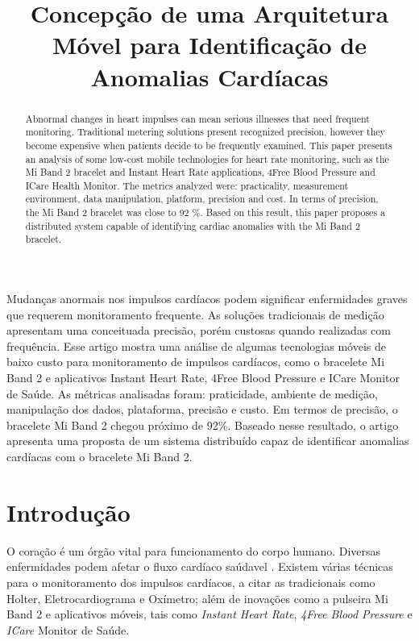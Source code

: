 \documentclass[12pt]{article}
\title{Concepção de uma Arquitetura Móvel para Identificação de Anomalias Cardíacas}
\begin{document}
 

\maketitle

\begin{abstract}
  Abnormal changes in heart impulses can mean serious illnesses that need frequent monitoring. Traditional metering solutions present recognized precision, however they become expensive when patients decide to be frequently examined. This paper presents an analysis of some low-cost mobile technologies for heart rate monitoring, such as the Mi Band 2 bracelet and Instant Heart Rate applications, 4Free Blood Pressure and ICare Health Monitor. The metrics analyzed were: practicality, measurement environment, data manipulation, platform, precision and cost. In terms of precision, the Mi Band 2 bracelet was close to 92 \%. Based on this result, this paper proposes a distributed system capable of identifying cardiac anomalies with the Mi Band 2 bracelet.
\end{abstract}
 
\begin{resumo}
  Mudanças anormais nos impulsos cardíacos podem significar enfermidades graves que requerem monitoramento frequente. As soluções tradicionais de medição apresentam uma conceituada precisão, porém custosas quando realizadas com frequência. Esse artigo mostra uma análise de algumas tecnologias móveis de baixo custo para monitoramento de impulsos cardíacos, como o bracelete Mi Band 2 e aplicativos Instant Heart Rate, 4Free Blood Pressure e ICare Monitor de Saúde. As métricas analisadas foram: praticidade, ambiente de medição, manipulação dos dados, plataforma, precisão e custo. Em termos de precisão, o bracelete Mi Band 2 chegou próximo de 92\%. Baseado nesse resultado, o artigo apresenta uma proposta de um sistema distribuído capaz de identificar anomalias cardíacas com o bracelete Mi Band 2.
\end{resumo}

\section{Introdução}

O coração é um órgão vital para funcionamento do corpo humano. Diversas enfermidades podem afetar o fluxo cardíaco saúdavel \cite{AE}. Existem várias técnicas para o monitoramento dos impulsos cardíacos, a citar as tradicionais como Holter, Eletrocardiograma e Oxímetro; além de inovações como a pulseira Mi Band 2 e aplicativos móveis, tais como \textit{Instant Heart Rate}, \textit{4Free Blood Pressure} e \textit{ICare} Monitor de Saúde.
\end{document}
